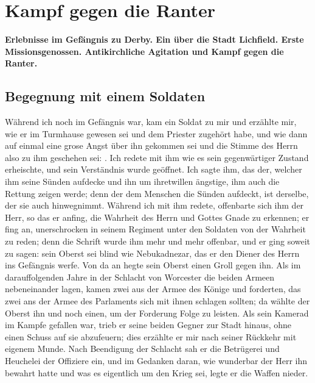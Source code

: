 \chapter[Kampf gegen die Ranter]{Kampf gegen die Ranter}

\begin{center}
\textbf{Erlebnisse im Gefängnis zu Derby. Ein  
über die Stadt
Lichfield. Erste Missionsgenossen. Antikirchliche 
Agitation und Kampf gegen die Ranter.}
\end{center}

\section{Begegnung mit einem Soldaten}

Während ich noch im Gefängnis war, kam ein Soldat zu
mir und erzählte mir, wie er im Turmhause gewesen sei und dem
Priester zugehört habe, und wie dann auf einmal eine grose Angst
über ihn gekommen sei und die Stimme des Herrn also zu ihm
geschehen sei: . Ich redete mit ihm
wie es sein gegenwärtiger Zustand erheischte, und sein Verständnis
wurde geöffnet. Ich sagte ihm, das der, welcher ihm seine Sünden
aufdecke und ihn um ihretwillen ängstige, ihm auch die Rettung
zeigen werde; denn der dem Menschen die 
Sünden aufdeckt, ist
derselbe, der sie auch hinwegnimmt. Während ich mit ihm redete,
offenbarte sich ihm der Herr, so das er anfing, die Wahrheit des
Herrn und Gottes Gnade zu erkennen; er fing an, unerschrocken
in seinem Regiment unter den Soldaten von 
der Wahrheit zu
reden; denn die Schrift wurde ihm mehr und mehr offenbar, und
er ging soweit zu sagen: sein Oberst sei blind wie Nebukadnezar,
das er den Diener des Herrn ins Gefängnis werfe. Von da an
hegte sein Oberst einen Groll gegen ihn. Als im darauffolgenden
Jahre in der Schlacht von Worcester 
die beiden Armeen 
nebeneinander lagen, kamen zwei aus der Armee des Könige und
forderten, das zwei ans der Armee des Parlaments sich mit ihnen
schlagen sollten; da wählte der Oberst ihn und noch einen, um
der Forderung Folge zu leisten. Als sein Kamerad im Kampfe
gefallen war, trieb er seine beiden Gegner zur Stadt hinaus, ohne
einen Schuss auf sie abzufeuern; dies erzählte er mir nach seiner
Rückkehr mit eigenem Munde. Nach Beendigung der Schlacht
sah er die Betrügerei und Heuchelei der Offiziere ein, und im
Gedanken daran, wie wunderbar der Herr ihn bewahrt hatte und
was es eigentlich um den Krieg sei, legte er die Waffen 
nieder.


